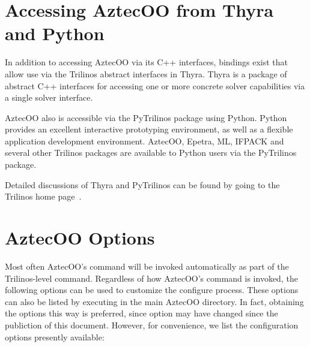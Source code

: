 \documentclass[12pt,relax]{AztecOOUserGuide}
\renewcommand{\vector}{Epetra\_Vector}
\newcommand{\distobject}{Epetra\_DistObject}
\begin{document}
\section{Accessing AztecOO from Thyra and Python}

In addition to accessing AztecOO via its C++ interfaces, bindings
exist that allow use via the Trilinos abstract interfaces in Thyra.
Thyra is a package of abstract C++ interfaces for accessing one or
more concrete solver capabilities via a single solver interface.

AztecOO also is accessible via the PyTrilinos package using Python.
Python provides an excellent interactive prototyping environment, as
well as a flexible application development environment.  AztecOO,
Epetra, ML, IFPACK and several other Trilinos packages are available
to Python users via the PyTrilinos package.

Detailed discussions of Thyra and PyTrilinos can be found by going
to the Trilinos home page~\cite{Trilinos-home-page}.

\clearpage

%


\appendix
\section{AztecOO  Options}

Most often AztecOO's  command will be invoked automatically as
part of the Trilinos-level  command.  Regardless of how
AztecOO's  command is invoked, the following options can be
used to customize the configure process.  These options can also be listed  by executing
in the main AztecOO directory.  In fact, obtaining the options this way is preferred, since
option may have changed since the publiction of this document.  However, for convenience, we
list the configuration options presently available:


\end{document}
